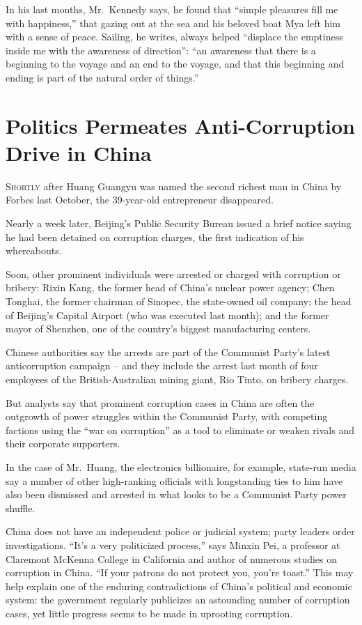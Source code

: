 ﻿\documentclass[12pt]{article}
\begin{document}
In his last months, Mr.~Kennedy says, he found that ``simple pleasures fill me with happiness,''
that gazing out at the sea and his beloved boat Mya left him with a sense of peace. Sailing, he
writes, always helped ``displace the emptiness inside me with the awareness of direction'': ``an
awareness that there is a beginning to the voyage\cite{voyage} and an end to the voyage, and that
this beginning and ending is part of the natural order of things.''

\section{Politics Permeates\cite{permeate} Anti-Corruption Drive in China}

\lettrine{S}{hortly} after Huang Guangyu was named the second richest man in China by Forbes last
October, the 39-year-old entrepreneur disappeared.

Nearly a week later, Beijing's Public Security Bureau issued a brief notice saying he had been
detained on corruption charges, the first indication of his whereabouts.

Soon, other prominent individuals were arrested or charged with corruption or bribery: Rixin Kang,
the former head of China's nuclear power agency; Chen Tonghai, the former chairman of Sinopec, the
state-owned oil company; the head of Beijing's Capital Airport (who was executed last month); and
the former mayor of Shenzhen, one of the country's biggest manufacturing centers.

Chinese authorities say the arrests are part of the Communist Party's latest anticorruption campaign
-- and they include the arrest last month of four employees of the British-Australian mining giant,
Rio Tinto, on bribery charges.

But analysts say that prominent corruption cases in China are often the outgrowth of power struggles
within the Communist Party, with competing factions using the ``war on corruption'' as a tool to
eliminate or weaken rivals and their corporate supporters.

In the case of Mr.~Huang, the electronics billionaire, for example, state-run media say a number of
other high-ranking officials with longstanding ties to him have also been dismissed and arrested in
what looks to be a Communist Party power shuffle.

China does not have an independent police or judicial system; party leaders order investigations.
``It's a very politicized process,'' says Minxin Pei, a professor at Claremont McKenna College in
California and author of numerous studies on corruption in China. ``If your patrons do not protect
you, you're toast.'' This may help explain one of the enduring contradictions of China's political
and economic system: the government regularly publicizes an astounding number of corruption cases,
yet little progress seems to be made in uprooting corruption.
\end{document}
